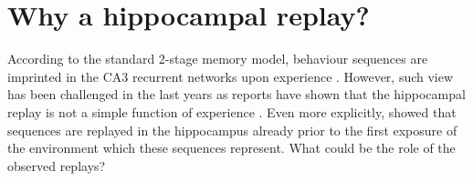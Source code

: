 


\section{Why a hippocampal replay?}
  According to the standard 2-stage memory model, behaviour sequences are
  imprinted in the CA3 recurrent networks upon experience \citep{Marr1971,
  Buzsaki1989}. However, such view has been challenged in the last years as
  reports have shown that the hippocampal replay is not a simple function of
  experience \citep[e.g.,][]{Gupta2010}. Even more explicitly,
  \cite{Dragoi2011, Dragoi2013} showed that sequences are replayed in the
  hippocampus already prior to the first exposure of the environment which
  these sequences represent. What could be the role of the observed replays? 
  
